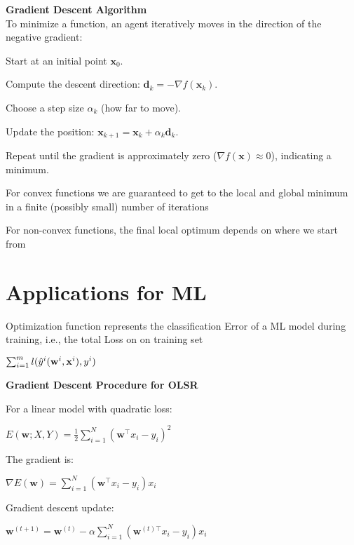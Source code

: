 \vspace{0.5em}
\textbf{Gradient Descent Algorithm}\\
To minimize a function, an agent iteratively moves in the direction of the negative gradient:

\begin{tightitemize}
    \item Start at an initial point $\mathbf{x}_0$.
    \item Compute the descent direction: $\mathbf{d}_k = -\nabla f(\mathbf{x}_k)$.
    \item Choose a step size $\alpha_k$ (how far to move).
    \item Update the position: $\mathbf{x}_{k+1} = \mathbf{x}_k + \alpha_k \mathbf{d}_k$.
    \item Repeat until the gradient is approximately zero ($\nabla f(\mathbf{x}) \approx 0$), indicating a minimum.
\end{tightitemize}

For convex functions we are guaranteed to get to the local and global minimum 
in a finite (possibly small) number of iterations

For non-convex functions, the final local optimum depends on where we start from

\section*{Applications for ML}

Optimization function represents the classification Error of a ML model during training,
i.e., the total Loss on on training set 

$
\sum_{i=1}^{m}l(\hat{y}^i(\mathbf{w}^i, \mathbf{x}^i), y^i)
$

\textbf{Gradient Descent Procedure for OLSR}

For a linear model with quadratic loss:

$
E(\mathbf{w}; X, Y) = \frac{1}{2} \sum_{i=1}^N (\mathbf{w}^\top x_i - y_i)^2
$

The gradient is:

$
\nabla E(\mathbf{w}) = \sum_{i=1}^N (\mathbf{w}^\top x_i - y_i)x_i
$

Gradient descent update:

$
\mathbf{w}^{(t+1)} = \mathbf{w}^{(t)} - \alpha \sum_{i=1}^N (\mathbf{w}^{(t)\top} x_i - y_i)x_i
$

